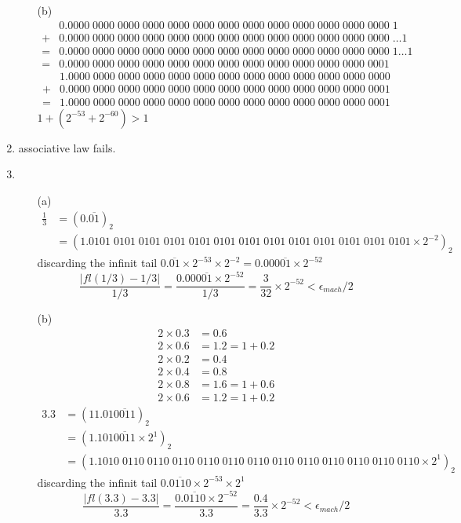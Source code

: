 \documentclass[UTF8]{ctexart}
\begin{document}
\begin{enumerate}
\begin{itemize}
\item[(b)]
\begin{align*}
 &0.0000\;0000\;0000\;0000\;0000\;0000\;0000\;0000\;0000\;0000\;0000\;0000\;0000\;1 \\
+&0.0000\;0000\;0000\;0000\;0000\;0000\;0000\;0000\;0000\;0000\;0000\;0000\;0000\;\dots 1 \\
\hline
=&0.0000\;0000\;0000\;0000\;0000\;0000\;0000\;0000\;0000\;0000\;0000\;0000\;0000\;1\dots 1 \\
=&0.0000\;0000\;0000\;0000\;0000\;0000\;0000\;0000\;0000\;0000\;0000\;0000\;0001
\end{align*}
\begin{align*}
 &1.0000\;0000\;0000\;0000\;0000\;0000\;0000\;0000\;0000\;0000\;0000\;0000\;0000 \\
+&0.0000\;0000\;0000\;0000\;0000\;0000\;0000\;0000\;0000\;0000\;0000\;0000\;0001 \\
\hline
=&1.0000\;0000\;0000\;0000\;0000\;0000\;0000\;0000\;0000\;0000\;0000\;0000\;0001
\end{align*}
$1 + (2^{-53} + 2^{-60}) > 1$
\end{itemize}

\item associative law fails.
\item \begin{itemize}
\item[(a)] 
\begin{align*}
\frac{1}{3} &= (0.\overline{01})_2 \\
&= (1.0101\;0101\;0101\;0101\;0101\;0101\;0101\;0101\;0101\;0101\;0101\;0101\;0101 \times 2^{-2})_2
\end{align*}
discarding the infinit tail $0.\overline{01} \times 2^{-53} \times 2^{-2} = 0.000\overline{01} \times 2^{-52}$ \\
\[
	\frac{|fl(1/3) - 1/3|}{1/3} = \frac{0.000\overline{01} \times 2^{-52}}{1/3} = \frac{3}{32} \times 2^{-52} < \epsilon_{mach}/2
\]
\item[(b)]
\begin{align*}
2 \times 0.3 &= 0.6 \\
2 \times 0.6 &= 1.2 = 1 + 0.2 \\
2 \times 0.2 &= 0.4 \\
2 \times 0.4 &= 0.8 \\
2 \times 0.8 &= 1.6 = 1 + 0.6 \\
2 \times 0.6 &= 1.2 = 1 + 0.2
\end{align*}
\begin{align*}
3.3 &= (11.01\overline{0011})_2 \\
&= (1.101\overline{0011} \times 2^{1})_2 \\
&= (1.1010\;0110\;0110\;0110\;0110\;0110\;0110\;0110\;0110\;0110\;0110\;0110\;0110 \times 2^1)_2
\end{align*}
discarding the infinit tail $0.\overline{0110} \times 2^{-53} \times 2^1$
\[
	\frac{|fl(3.3) - 3.3|}{3.3} = \frac{0.\overline{0110} \times 2^{-52}}{3.3} = \frac{0.4}{3.3} \times 2^{-52} < \epsilon_{mach}/2
\]


\end{itemize}
\end{enumerate}
\end{document}
